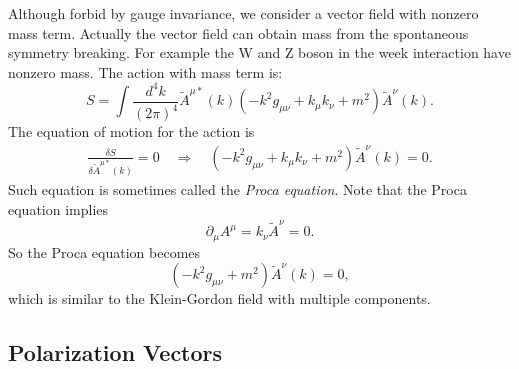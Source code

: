 Although forbid by gauge invariance, we consider a vector field with nonzero mass term.
Actually the vector field can obtain mass from the spontaneous symmetry breaking.
For example the W and Z boson in the week interaction have nonzero mass.
The action with mass term is:
\begin{equation}
	S = \int \frac{d^4 k}{(2\pi)^4} \tilde{A}^{\mu *}(k) \left(-k^2 g_{\mu\nu}+k_\mu k_\nu + m^2 \right) \tilde{A}^\nu(k).
\end{equation}
The equation of motion for the action is
\begin{equation}
\begin{aligned}
	\frac{\delta S}{\delta \tilde{A}^{\mu *}(k)} = 0 
	\quad \Longrightarrow \quad 
	\left(-k^2 g_{\mu\nu}+k_\mu k_\nu + m^2 \right) \tilde{A}^\nu(k) = 0.
\end{aligned}
\end{equation}
Such equation is sometimes called the \textit{Proca equation}.
Note that the Proca equation implies
\begin{equation}
	\partial_\mu A^\mu = k_\nu \tilde{A}^\nu = 0.
\end{equation}
So the Proca equation becomes
\begin{equation}
	\left(-k^2 g_{\mu\nu} + m^2 \right) \tilde{A}^\nu(k) = 0,
\end{equation}
which is similar to the Klein-Gordon field with multiple components.

\subsection{Polarization Vectors}
